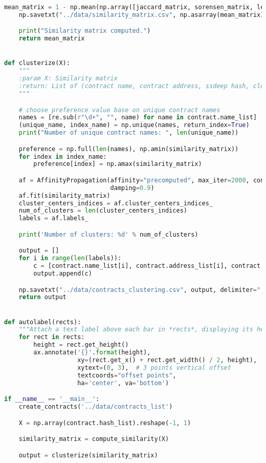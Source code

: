 \begin{lstlisting}[language=Python]
    mean_matrix = 1 - np.mean(np.array([jaccard_matrix, sorensen_matrix, levenshtein_matrix]), axis=0)
    np.savetxt("../data/similarity_matrix.csv", np.asarray(mean_matrix), delimiter=",")

    print("Similarity matrix computed.")
    return mean_matrix


def clusterize(X):
    """
    :param X: Similarity matrix
    :return: List of (contract name, contract address, ssdeep hash, cluster label)
    """

    # choose preference value base on unique contract names
    names = [re.sub(r"\d+", "", name) for name in contract.name_list]
    (unique_name, index_name) = np.unique(names, return_index=True)
    print("Number of unique contract names: ", len(unique_name))

    preference = np.full(len(names), np.amin(similarity_matrix))
    for index in index_name:
        preference[index] = np.amax(similarity_matrix)

    af = AffinityPropagation(affinity="precomputed", max_iter=2000, convergence_iter=200, preference=preference,
                             damping=0.9)
    af.fit(similarity_matrix)
    cluster_centers_indices = af.cluster_centers_indices_
    num_of_clusters = len(cluster_centers_indices)
    labels = af.labels_

    print('Number of clusters: %d' % num_of_clusters)

    output = []
    for i in range(len(labels)):
        c = [contract.name_list[i], contract.address_list[i], contract.hash_list[i], labels[i]]
        output.append(c)

    np.savetxt("../data/contracts_clustering.csv", output, delimiter=",", fmt='%s')
    return output


def autolabel(rects):
    """Attach a text label above each bar in *rects*, displaying its height."""
    for rect in rects:
        height = rect.get_height()
        ax.annotate('{}'.format(height),
                    xy=(rect.get_x() + rect.get_width() / 2, height),
                    xytext=(0, 3),  # 3 points vertical offset
                    textcoords="offset points",
                    ha='center', va='bottom')

if __name__ == '__main__':
    create_contracts('../data/contracts_list')

    X = np.array(contract.hash_list).reshape(-1, 1)

    similarity_matrix = compute_similarity(X)

    output = clusterize(similarity_matrix)


\end{lstlisting}
